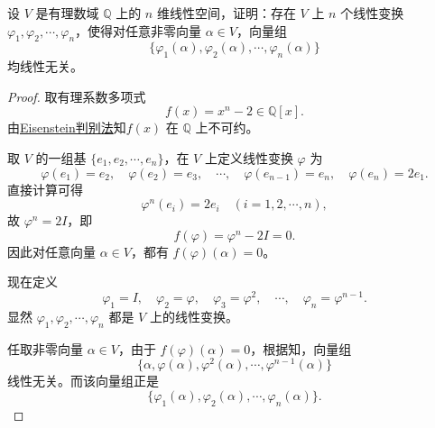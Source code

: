 \documentclass[../../main.tex]{subfiles}%
\begin{document}
\begin{example}
设 $V$ 是有理数域 $\mathbb Q$ 上的 $n$ 维线性空间，证明：存在 $V$ 上 $n$ 个线性变换
$\varphi_1,\varphi_2,\cdots,\varphi_n$，使得对任意非零向量 $\alpha\in V$，向量组
\[
\{\varphi_1(\alpha),\varphi_2(\alpha),\cdots,\varphi_n(\alpha)\}
\]
均线性无关。
\end{example}
\begin{proof}

取有理系数多项式
\[
f(x)=x^n-2\in\mathbb Q[x].
\]
由\hyperref[theorem:Eisenstein判别法]{Eisenstein判别法}知$f(x)$ 在 $\mathbb Q$ 上不可约。

取 $V$ 的一组基 $\{e_1,e_2,\cdots,e_n\}$，在 $V$ 上定义线性变换 $\varphi$ 为
\[
\varphi(e_1)=e_2,\quad \varphi(e_2)=e_3,\quad \cdots,\quad \varphi(e_{n-1})=e_n,\quad \varphi(e_n)=2e_1.
\]
直接计算可得
\[
\varphi^n(e_i)=2e_i\quad (i=1,2,\cdots,n),
\]
故 $\varphi^n=2I$，即
\[
f(\varphi)=\varphi^n-2I=0.
\]
因此对任意向量 $\alpha\in V$，都有 $f(\varphi)(\alpha)=0$。

现在定义
\[
\varphi_1=I,\quad \varphi_2=\varphi,\quad \varphi_3=\varphi^2,\quad \cdots,\quad \varphi_n=\varphi^{n-1}.
\]
显然 $\varphi_1,\varphi_2,\cdots,\varphi_n$ 都是 $V$ 上的线性变换。

任取非零向量 $\alpha\in V$，由于 $f(\varphi)(\alpha)=0$，根据知，向量组
\[
\{\alpha,\varphi(\alpha),\varphi^2(\alpha),\cdots,\varphi^{n-1}(\alpha)\}
\]
线性无关。而该向量组正是
\[
\{\varphi_1(\alpha),\varphi_2(\alpha),\cdots,\varphi_n(\alpha)\}.
\]\end{proof}
\end{document}
